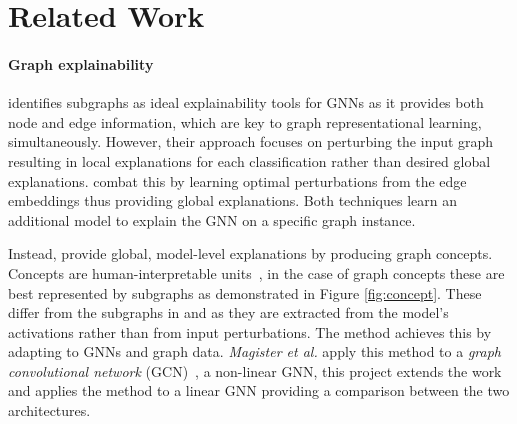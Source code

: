 \section{Related Work}

\paragraph{Graph explainability}
\citet{ying2019gnnexplainer} identifies subgraphs as ideal explainability tools for GNNs as it provides both node and edge information, which are key to graph representational learning, simultaneously. 
However, their approach focuses on perturbing the input graph resulting in local explanations for each classification rather than desired global explanations.
\citet{luo2020parameterized} combat this by learning optimal perturbations from the edge embeddings thus providing global explanations.
Both techniques learn an additional model to explain the GNN on a specific graph instance.

Instead, \citet{magister2021gcexplainer} provide global, model-level explanations by producing graph concepts.
Concepts are human-interpretable units~\cite{ghorbani2019towards}, in the case of graph concepts these are best represented by subgraphs as demonstrated in Figure \ref{fig:concept}.
These differ from the subgraphs in \citet{ying2019gnnexplainer} and \citet{luo2020parameterized} as they are extracted from the model's activations rather than from input perturbations.
The method achieves this by adapting \citet{ghorbani2019towards} to GNNs and graph data.
\textit{Magister et al.} apply this method to a \emph{graph convolutional network} (GCN)~\cite{kipf2016semi}, a non-linear GNN, this project extends the work and applies the method to a linear GNN providing a comparison between the two architectures.

